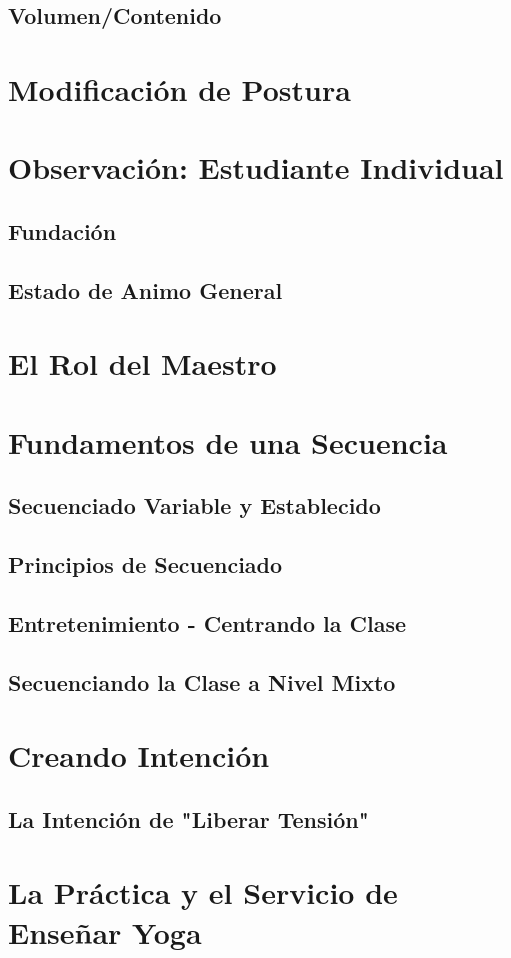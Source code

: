 \subsection{Volumen/Contenido}
\section{Modificación de Postura}
\section{Observación: Estudiante Individual}
\subsection{Fundación}
\subsection{Estado de Animo General}
\section{El Rol del Maestro}
\section{Fundamentos de una Secuencia}
\label{sec:fundSec}
\subsection{Secuenciado Variable y Establecido}
\subsection{Principios de Secuenciado}
\subsection{Entretenimiento - Centrando la Clase}
\subsection{Secuenciando la Clase a Nivel Mixto}
\section{Creando Intención}
\subsection{La Intención de "Liberar Tensión"}
\section{La Práctica y el Servicio de Enseñar Yoga}


